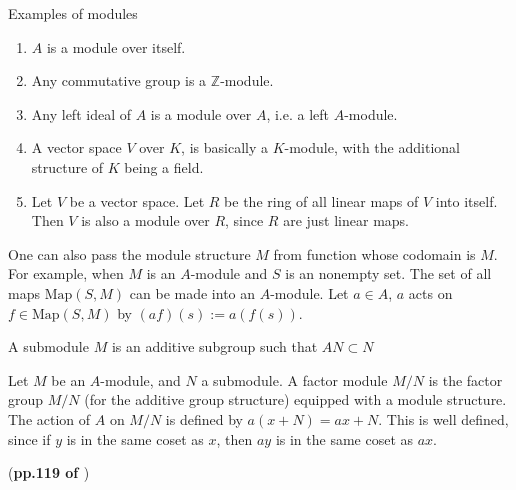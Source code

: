 \documentclass{article}
\begin{document}
\begin{ex}{Examples of modules}
    \begin{enumerate}
        \item $A$ is a module over itself.
        \item Any commutative group is a $\mathbb{Z}$-module.
        \item Any left ideal of $A$ is a module over $A$, i.e. a left
            $A$-module.
        \item A vector space $V$ over $K$, is basically a $K$-module,
            with the additional structure of $K$ being a field.
        \item Let $V$ be a vector space. 
            Let $R$ be the ring of all linear maps of $V$ into itself.
            Then $V$ is also a module over $R$, since $R$ are just
            linear maps.
    \end{enumerate}
\end{ex}
\begin{ex}
    One can also pass the module structure $M$ from function whose
    codomain is $M$. For example, when $M$ is an $A$-module and $S$ is
    an nonempty set. The set of all maps $\mathrm{Map}(S,M)$ can be
    made into an $A$-module. Let $a\in A$, $a$ acts on 
    $f\in \mathrm{Map}(S,M)$ by $(af)(s) := a(f(s))$.
\end{ex}

\begin{defi}[Submodule]
    A submodule $M$ is an additive subgroup such that 
    $AN\subset N$
\end{defi}

\begin{defi}
    Let $M$ be an $A$-module, and $N$ a submodule. 
    A factor module $M/N$ is the factor group $M/N$ (for the
    additive group structure) equipped with a module structure.
    The action of $A$ on $M/N$ is defined by $a(x+N) = ax+N$.
    This is well defined, since if $y$ is in the same coset as
    $x$, then $ay$ is in the same coset as $ax$.
\end{defi}
(\textbf{pp.119 of \cite{lang}})
\end{document}
